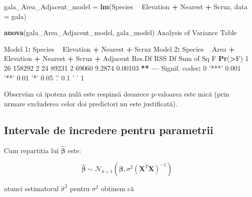 \documentclass[]{article}
\newenvironment{Shaded}{\begin{snugshade}}{\end{snugshade}}
\newcommand{\KeywordTok}[1]{\textcolor[rgb]{0.13,0.29,0.53}{\textbf{#1}}}
\newcommand{\DataTypeTok}[1]{\textcolor[rgb]{0.13,0.29,0.53}{#1}}
\newcommand{\DecValTok}[1]{\textcolor[rgb]{0.00,0.00,0.81}{#1}}
\newcommand{\FloatTok}[1]{\textcolor[rgb]{0.00,0.00,0.81}{#1}}
\newcommand{\StringTok}[1]{\textcolor[rgb]{0.31,0.60,0.02}{#1}}
\newcommand{\OperatorTok}[1]{\textcolor[rgb]{0.81,0.36,0.00}{\textbf{#1}}}
\newcommand{\NormalTok}[1]{#1}
\begin{document}
\begin{Shaded}
\begin{Highlighting}[]
\NormalTok{gala_Area_Adjacent_model =}\StringTok{ }\KeywordTok{lm}\NormalTok{(Species }\OperatorTok{~}\StringTok{ }\NormalTok{Elevation }\OperatorTok{+}\StringTok{ }\NormalTok{Nearest }\OperatorTok{+}\StringTok{ }\NormalTok{Scruz, }
    \DataTypeTok{data =}\NormalTok{ gala)}

\KeywordTok{anova}\NormalTok{(gala_Area_Adjacent_model, gala_model)}
\NormalTok{Analysis of Variance Table}

\NormalTok{Model }\DecValTok{1}\OperatorTok{:}\StringTok{ }\NormalTok{Species }\OperatorTok{~}\StringTok{ }\NormalTok{Elevation }\OperatorTok{+}\StringTok{ }\NormalTok{Nearest }\OperatorTok{+}\StringTok{ }\NormalTok{Scruz}
\NormalTok{Model }\DecValTok{2}\OperatorTok{:}\StringTok{ }\NormalTok{Species }\OperatorTok{~}\StringTok{ }\NormalTok{Area }\OperatorTok{+}\StringTok{ }\NormalTok{Elevation }\OperatorTok{+}\StringTok{ }\NormalTok{Nearest }\OperatorTok{+}\StringTok{ }\NormalTok{Scruz }\OperatorTok{+}\StringTok{ }\NormalTok{Adjacent}
\NormalTok{  Res.Df    RSS Df Sum of Sq      F  }\KeywordTok{Pr}\NormalTok{(}\OperatorTok{>}\NormalTok{F)   }
\DecValTok{1}     \DecValTok{26} \DecValTok{158292}                               
\DecValTok{2}     \DecValTok{24}  \DecValTok{89231}  \DecValTok{2}     \DecValTok{69060} \FloatTok{9.2874} \FloatTok{0.00103} \OperatorTok{**}
\OperatorTok{---}
\NormalTok{Signif. codes}\OperatorTok{:}\StringTok{  }\DecValTok{0} \StringTok{'***'} \FloatTok{0.001} \StringTok{'**'} \FloatTok{0.01} \StringTok{'*'} \FloatTok{0.05} \StringTok{'.'} \FloatTok{0.1} \StringTok{' '} \DecValTok{1}
\end{Highlighting}
\end{Shaded}

Observăm că ipoteza nulă este respinsă deoarece p-valoarea este mică
(prin urmare excluderea celor doi predictori nu este justificată).

\subsection{Intervale de încredere pentru
parametrii}\label{intervale-de-incredere-pentru-parametrii}

Cum repartiția lui \(\hat{\boldsymbol{\beta}}\) este:

\[
\hat{\boldsymbol{\beta}}\sim\mathcal{N}_{k+1}\left(\boldsymbol\beta,\sigma^2(\mathbf{X}^T\mathbf{X})^{-1}\right)
\]

atunci estimatorul \(\hat\sigma^2\) pentru \(\sigma^2\) obținem că
\end{document}
